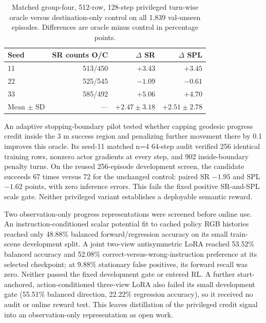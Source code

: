 \documentclass[10pt,twocolumn,letterpaper]{article}
\begin{document}
\begin{table}[t]
\centering
\caption{Matched group-four, 512-row, 128-step privileged turn-wise oracle
versus destination-only control on all 1,839 val-unseen episodes. Differences
are oracle minus control in percentage points.}
\label{tab:turnwise-oracle-scale}
\footnotesize
\begingroup\setlength{\tabcolsep}{4pt}
\begin{tabular}{lrrr}
\toprule
Seed & SR counts O/C & $\Delta$ SR & $\Delta$ SPL \\
\midrule
11 & 513/450 & $+3.43$ & $+3.45$ \\
22 & 525/545 & $-1.09$ & $-0.61$ \\
33 & 585/492 & $+5.06$ & $+4.70$ \\
Mean $\pm$ SD & --- & $+2.47\pm3.18$ & $+2.51\pm2.78$ \\
\bottomrule
\end{tabular}
\endgroup
\end{table}

An adaptive stopping-boundary pilot tested whether capping geodesic
progress credit inside the 3 m success region and penalizing further
movement there by 0.1 improves this oracle. Its seed-11 matched n=4
64-step audit verified 256 identical training rows, nonzero actor
gradients at every step, and 902 inside-boundary penalty turns. On the
reused 256-episode development screen, the candidate succeeds 67 times
versus 72 for the unchanged control: paired SR $-1.95$ and SPL $-1.62$
points, with zero inference errors. This fails the fixed positive
SR-and-SPL scale gate. Neither privileged variant establishes a
deployable semantic reward.

Two observation-only progress representations were screened before
online use. An instruction-conditioned scalar potential fit to cached
policy RGB histories reached only 48.88\% balanced forward/regression
accuracy on its small train-scene development split. A joint two-view
antisymmetric LoRA reached 53.52\% balanced accuracy and 52.08\%
correct-versus-wrong-instruction preference at its selected checkpoint;
at 9.88\% stationary false positives, its forward recall was zero.
Neither passed the fixed development gate or entered RL. A further
start-anchored, action-conditioned three-view LoRA also failed its
small development gate (55.51\% balanced direction, 22.22\% regression
accuracy), so it received no audit or online reward test. This leaves
distillation of the privileged credit signal into an observation-only
representation as open work.
\end{document}
